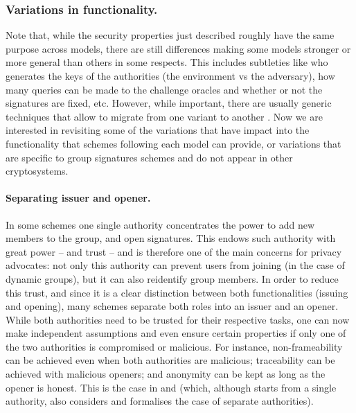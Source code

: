 \subsubsection{Variations in functionality.}
%
Note that, while the security properties just described roughly have the same
purpose across models, there are still differences making some models stronger
or more general than others in some respects. This includes subtleties like who
generates the keys of the authorities (the environment vs the adversary), how
many queries can be made to the challenge oracles and whether or not the
signatures are fixed, etc. However, while important, there are usually generic
techniques that allow to migrate from one variant to another \needcite. Now we
are interested in revisiting some of
the variations that have impact into the functionality that schemes
following each model can provide, or variations that are specific to group
signatures schemes and do not appear in other cryptosystems.

\paragraph{Separating issuer and opener.}
In some schemes \cite{bmw03,kty04} one single authority concentrates the
power to add new members to the group, and open signatures. This endows such authority with great
power -- and trust -- and is therefore one of the main concerns for privacy
advocates: not only this authority can prevent users from joining (in the case
of dynamic groups), but it can also reidentify group members. In order to reduce
this trust, and since it is a clear distinction between both functionalities
(issuing and opening), many schemes separate both roles into an issuer and an
opener. While both authorities need to be trusted for their respective tasks,
one can now make independent assumptions and even ensure certain properties
if only one of the two authorities is compromised or malicious. For instance,
non-frameability can be achieved even when both authorities are malicious;
traceability can be achieved with malicious openers; and anonymity can be
kept as long as the opener is honest. This is the case in \cite{bsz05} and
\cite{ky06} (which, although starts from a single authority, also considers
and formalises the case of separate authorities).

